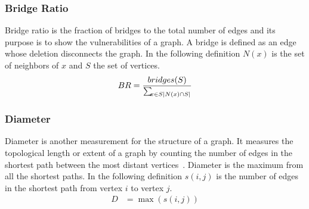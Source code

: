 \subsubsection{Bridge Ratio}
Bridge ratio is the fraction of bridges to the total number of edges and its purpose is to show the vulnerabilities of a graph. A bridge is defined as an edge whose deletion disconnects the graph. In the following definition ${\textstyle N(x)}$ is the set of neighbors of ${\textstyle x}$ and ${\textstyle S}$ the set of vertices.
\begin{align*}
  BR &= \frac{bridges(S)}{\sum_{\mkern-5mu x\in S \vert{N(x)\cap S}\vert}}\\
\end{align*}



\subsubsection{Diameter}
Diameter is another measurement for the structure of a graph. It measures the topological length or extent of a graph by counting the number of edges in the shortest path between the most distant vertices~\cite{diameter}. Diameter is the maximum from all the shortest paths. In the following definition ${\textstyle s(i, j)}$ is the number of edges in the shortest path from vertex ${\textstyle i}$ to vertex ${\textstyle j}$.
\begin{align*}
  D &= \max(s(i,j))\\
\end{align*}
